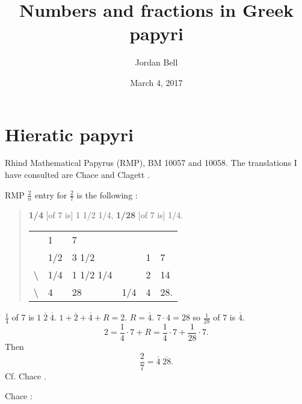\documentclass{article}
\begin{document}
\title{Numbers and fractions in Greek papyri}
\author{Jordan Bell}
\date{March 4, 2017}
\maketitle


 
\section{Hieratic papyri}
Rhind Mathematical Papyrus (RMP), BM 10057 and 10058. The translations I have consulted are 
Chace \cite{chace} and Clagett \cite{egyptian3}.

RMP $\frac{2}{n}$ entry for 
$\frac{2}{7}$ is the following \cite[p.~122]{egyptian3}:

\begin{quote}
\textbf{1/4} [of 7 is] 1 1/2 1/4, \textbf{1/28} [of 7 is] 1/4.

\begin{tabular}{llllll}
&1&7&&&\\
&1/2&3 1/2&&1&7\\
\textbackslash&1/4&1 1/2 1/4&&2&14\\
\textbackslash&4&28&1/4&4&28.
\end{tabular}
\end{quote}

$\frac{1}{4}$ of 7  is  $1 \; \overline{2} \; \overline{4}$.
$1 + \overline{2} + \overline{4} + R = 2$. $R=\overline{4}$.
$7\cdot 4 = 28$ so $\frac{1}{28}$ of $7$ is $\overline{4}$.
\[
2 = \frac{1}{4} \cdot 7 + R = \frac{1}{4} \cdot 7 + \frac{1}{28} \cdot 7.
\]
Then
\[
\frac{2}{7} = \overline{4} \; \overline{28}.
\]
Cf. Chace \cite[pp.~14--15]{chace}.

Chace \cite[pp.~5--6]{chace}:
\end{document}
